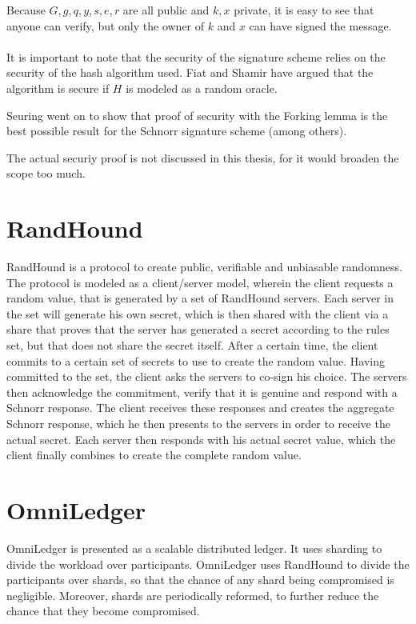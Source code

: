 Because $G,g,q,y,s,e,r$ are all public and $k,x$ private, it is easy to see that anyone can verify, but only the owner of $k$ and $x$ can have signed the message.
\\
\\
It is important to note that the security of the signature scheme relies on the security of the hash algorithm used. Fiat and Shamir have argued \cite{Oracle} that the algorithm is secure if $H$ is modeled as a random oracle.

Seuring went on to show \cite{Seuring} that proof of security with the Forking lemma is the best possible result for the Schnorr signature scheme (among others).

The actual securiy proof is not discussed in this thesis, for it would broaden the scope too much.

\section{RandHound}
RandHound \cite{RandHound} is a protocol to create public, verifiable and unbiasable randomness. The protocol is modeled as a client/server model, wherein the client requests a random value, that is generated by a set of RandHound servers. Each server in the set will generate his own secret, which is then shared with the client via a share that proves that the server has generated a secret according to the rules set, but that does not share the secret itself. After a certain time, the client commits to a certain set of secrets to use to create the random value. Having committed to the set, the client asks the servers to co-sign his choice. The servers then acknowledge the commitment, verify that it is genuine and respond with a Schnorr response. The client receives these responses and creates the aggregate Schnorr response, which he then presents to the servers in order to receive the actual secret. Each server then responds with his actual secret value, which the client finally combines to create the complete random value.

\section{OmniLedger}
OmniLedger \cite{OmniLedger} is presented as a scalable distributed ledger. It uses sharding to divide the workload over participants. OmniLedger uses RandHound to divide the participants over shards, so that the chance of any shard being compromised is negligible. Moreover, shards are periodically reformed, to further reduce the chance that they become compromised.